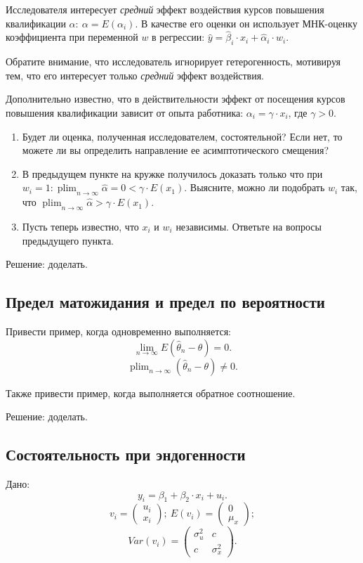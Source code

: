 \documentclass[10pt, a4paper]{extarticle}
\DeclareMathOperator{\plim}{plim}
\begin{document}
Исследователя интересует {\it средний} эффект воздействия курсов повышения квалификации $\alpha:\ \alpha = E(\alpha_{i})$. В качестве его оценки он использует МНК-оценку коэффициента при переменной $w$ в регрессии: $\hat y = \hat \beta_{i} \cdot x_{i} + \hat \alpha_{i} \cdot w_{i}$.

Обратите внимание, что исследователь игнорирует гетерогенность, мотивируя тем, что его интересует только {\it средний} эффект воздействия.

Дополнительно известно, что в действительности эффект от посещения курсов повышения квалификации зависит от опыта работника: $\alpha_{i} = \gamma \cdot x_i$, где $\gamma>0$. 

\begin{enumerate}
	\item  Будет ли оценка, полученная исследователем, состоятельной? Если нет, то можете ли вы определить направление ее асимптотического смещения?
	\item В предыдущем пункте на кружке получилось доказать только что при $w_{i} = 1: \plim_{n \to \infty} \hat \alpha = 0 < \gamma \cdot E(x_{1})$. Выясните, можно ли подобрать $w_{i}$ так, что $\plim_{n \to \infty} \hat \alpha > \gamma \cdot E(x_{1})$.
	\item Пусть теперь известно, что $x_{i}$ и $w_{i}$ независимы. Ответьте на вопросы предыдущего пункта.
\end{enumerate}

Решение: доделать.

\subsection{Предел матожидания и предел по вероятности}

Привести пример, когда одновременно выполняется:
\[
\lim_{n \to \infty}
E(\hat \theta_{n} - \theta) = 0.
\]
\[
\plim_{n \to \infty}
(\hat \theta_{n} - \theta) \neq 0.
\]

Также привести пример, когда выполняется обратное соотношение.

Решение: доделать.

\subsection{Состоятельность при эндогенности}

Дано: \[ y_{i} = \beta_{1} + \beta_{2} \cdot x_{i} + u_{i}.\]
\[v_{i} = \begin{pmatrix}  u_{i} \\ x_{i} \end{pmatrix}; \ E(v_{i}) = \begin{pmatrix}  0 \\ \mu_{x} \end{pmatrix};
\]
\[
Var(v_{i}) = \begin{pmatrix}  \sigma_{u}^2 & c \\
c & \sigma_{x}^2 \end{pmatrix}.
\]
\end{document}
